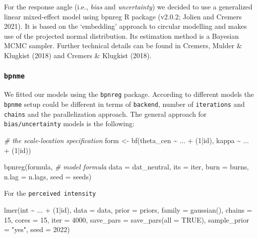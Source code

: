\documentclass[
]{article}
\newenvironment{Shaded}{}{}
\newcommand{\AttributeTok}[1]{\textcolor[rgb]{0.49,0.56,0.16}{#1}}
\newcommand{\CommentTok}[1]{\textcolor[rgb]{0.38,0.63,0.69}{\textit{#1}}}
\newcommand{\ConstantTok}[1]{\textcolor[rgb]{0.53,0.00,0.00}{#1}}
\newcommand{\DecValTok}[1]{\textcolor[rgb]{0.25,0.63,0.44}{#1}}
\newcommand{\FunctionTok}[1]{\textcolor[rgb]{0.02,0.16,0.49}{#1}}
\newcommand{\NormalTok}[1]{#1}
\newcommand{\OtherTok}[1]{\textcolor[rgb]{0.00,0.44,0.13}{#1}}
\newcommand{\SpecialCharTok}[1]{\textcolor[rgb]{0.25,0.44,0.63}{#1}}
\newcommand{\StringTok}[1]{\textcolor[rgb]{0.25,0.44,0.63}{#1}}
\begin{document}
For the response angle (i.e., \emph{bias} and \emph{uncertainty}) we decided to use a generalized linear mixed-effect model using bpnreg R package (v2.0.2; Jolien and Cremers 2021). It is based on the `embedding' approach to circular modelling and makes use of the projected normal distribution. Its estimation method is a Bayesian MCMC sampler. Further technical details can be found in Cremers, Mulder \& Klugkist (2018) and Cremers \& Klugkist (2018).

\hypertarget{bpnme}{%
\subsubsection{\texorpdfstring{\texttt{bpnme}}{bpnme}}\label{bpnme}}

We fitted our models using the \texttt{bpnreg} package. According to different models the \texttt{bpnme} setup could be different in terms of \texttt{backend}, number of \texttt{iterations} and \texttt{chains} and the parallelization approach. The general approach for \texttt{bias/uncertainty} models is the following:

\begin{Shaded}
\begin{Highlighting}[]
\CommentTok{\# the scale{-}location specification}
\NormalTok{form }\OtherTok{\textless{}{-}} \FunctionTok{bf}\NormalTok{(theta\_cen }\SpecialCharTok{\textasciitilde{}}\NormalTok{ ... }\SpecialCharTok{+}\NormalTok{ (}\DecValTok{1}\SpecialCharTok{|}\NormalTok{id), }
\NormalTok{           kappa }\SpecialCharTok{\textasciitilde{}}\NormalTok{ ... }\SpecialCharTok{+}\NormalTok{ (}\DecValTok{1}\SpecialCharTok{|}\NormalTok{id))}

\FunctionTok{bpnreg}\NormalTok{(formula, }\CommentTok{\# model formula}
       \AttributeTok{data =}\NormalTok{ dat\_neutral,}
       \AttributeTok{its =}\NormalTok{ iter,}
       \AttributeTok{burn =}\NormalTok{ burns,}
       \AttributeTok{n.lag =}\NormalTok{ n.lags,}
       \AttributeTok{seed =}\NormalTok{ seeds)}
\end{Highlighting}
\end{Shaded}

For the \texttt{perceived\ intensity}

\begin{Shaded}
\begin{Highlighting}[]
\FunctionTok{lmer}\NormalTok{(int }\SpecialCharTok{\textasciitilde{}}\NormalTok{ ... }\SpecialCharTok{+}\NormalTok{ (}\DecValTok{1}\SpecialCharTok{|}\NormalTok{id),}
    \AttributeTok{data =}\NormalTok{ data,}
    \AttributeTok{prior =}\NormalTok{ priors,}
    \AttributeTok{family =} \FunctionTok{gaussian}\NormalTok{(),}
    \AttributeTok{chains =} \DecValTok{15}\NormalTok{,}
    \AttributeTok{cores =} \DecValTok{15}\NormalTok{,}
    \AttributeTok{iter =} \DecValTok{4000}\NormalTok{,}
    \AttributeTok{save\_pars =} \FunctionTok{save\_pars}\NormalTok{(}\AttributeTok{all =} \ConstantTok{TRUE}\NormalTok{),}
    \AttributeTok{sample\_prior =} \StringTok{"yes"}\NormalTok{,}
    \AttributeTok{seed =} \DecValTok{2022}\NormalTok{)}
\end{Highlighting}
\end{Shaded}
\end{document}
